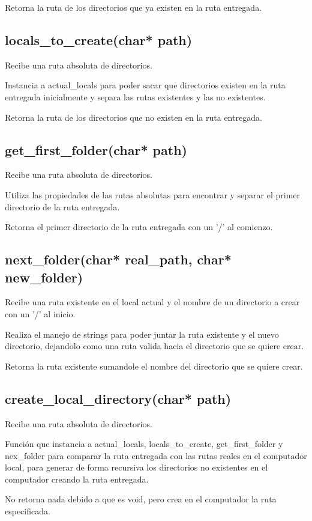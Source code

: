 \documentclass[12pt]{article}
\begin{document}
Retorna la ruta de los directorios que ya existen en la ruta entregada.

\subsection{locals\_to\_create(char* path)}
Recibe una ruta absoluta de directorios.

Instancia a actual\_locals para poder sacar que directorios existen en la ruta entregada inicialmente y separa las rutas existentes y las no existentes.

Retorna la ruta de los directorios que no existen en la ruta entregada.


\subsection{get\_first\_folder(char* path)}
Recibe una ruta absoluta de directorios.

Utiliza las propiedades de las rutas absolutas para encontrar y separar el primer directorio de la ruta entregada.

Retorna el primer directorio de la ruta entregada con un '/' al comienzo.

\subsection{next\_folder(char* real\_path, char* new\_folder)}
Recibe una ruta existente en el local actual y el nombre de un directorio a crear con un '/' al inicio.

Realiza el manejo de strings para poder juntar la ruta existente y el nuevo directorio, dejandolo como una ruta valida hacia el directorio que se quiere crear. 

Retorna la ruta existente sumandole el nombre del directorio que se quiere crear.

\subsection{create\_local\_directory(char* path)}
Recibe una ruta absoluta de directorios.

Función que instancia a actual\_locals, locals\_to\_create, get\_first\_folder y nex\_folder para comparar la ruta entregada con las rutas reales en el computador local, para generar de forma recursiva los directorios no existentes en el computador creando la ruta entregada.

No retorna nada debido a que es void, pero crea en el computador la ruta especificada.
\end{document}

